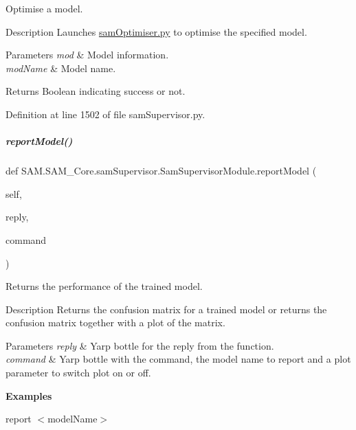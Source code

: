 Optimise a model. 

\begin{DoxyParagraph}{Description}
Launches \hyperlink{samOptimiser_8py}{sam\+Optimiser.\+py} to optimise the specified model.
\end{DoxyParagraph}

\begin{DoxyParams}{Parameters}
{\em mod} & Model information. \\
\hline
{\em mod\+Name} & Model name.\\
\hline
\end{DoxyParams}
\begin{DoxyParagraph}{Returns}
Boolean indicating success or not. 
\end{DoxyParagraph}


Definition at line 1502 of file sam\+Supervisor.\+py.

\mbox{\label{group__icubclient__SAM__Core_a810140960cafeed884a09f69ec5f6025}} 
\subparagraph{\texorpdfstring{report\+Model()}{reportModel()}}
{\footnotesize\ttfamily def S\+A\+M.\+S\+A\+M\+\_\+\+Core.\+sam\+Supervisor.\+Sam\+Supervisor\+Module.\+report\+Model (\begin{DoxyParamCaption}\item[{}]{self,  }\item[{}]{reply,  }\item[{}]{command }\end{DoxyParamCaption})}



Returns the performance of the trained model. 

\begin{DoxyParagraph}{Description}
Returns the confusion matrix for a trained model or returns the confusion matrix together with a plot of the matrix.
\end{DoxyParagraph}

\begin{DoxyParams}{Parameters}
{\em reply} & Yarp bottle for the reply from the function. \\
\hline
{\em command} & Yarp bottle with the command, the model name to report and a plot parameter to switch plot on or off.\\
\hline
\end{DoxyParams}
{\bfseries Examples} 
\begin{DoxyCode}
\end{DoxyCode}
 report $<$model\+Name$>$ ~\newline

